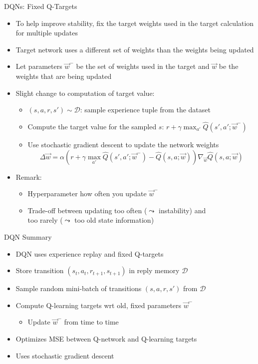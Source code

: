 \begin{frame}[c]{DQNs: Fixed Q-Targets}
	
	\begin{itemize}
		\item To help improve stability, fix the \alert{target weights} used in the target calculation for multiple updates
		\item Target network uses a different set of weights than the weights being updated
		\item Let parameters $\vec{w}^-$ be the set of weights used in the target and $\vec{w}$ be the weights that are being updated
		\item Slight change to computation of target value:
		\begin{itemize}
			\item $(s,a,r,s')\sim \mathcal{D}$: sample experience tuple from the dataset
			\item Compute the target value for the sampled $s$: $r+\gamma \max_{a'} \hat{Q}(s',a';\vec{w}^-)$
			\item Use stochastic gradient descent to update the network weights
			$$\Delta \vec{w} = \alpha (r + \gamma \max_{a'} \hat{Q}(s',a';\vec{w}^-) - \hat{Q}(s,a;\vec{w})) \nabla_{\vec{w}}\hat{Q}(s,a;\vec{w})$$
		\end{itemize}
		\smallskip 
		\pause
		\item Remark:
		\begin{itemize}
			\item Hyperparameter how often you update $\vec{w}^-$
			\item Trade-off between updating too often ($\leadsto$ instability) and\\ too rarely ($\leadsto$ too old state information)
		\end{itemize}
	\end{itemize}
	
\end{frame}
\begin{frame}[c]{DQN Summary}
	
	\begin{itemize}
		\item DQN uses experience replay and fixed Q-targets
		\item Store transition $(s_t, a_t, r_{t+1}, s_{t+1})$ in reply memory $\mathcal{D}$
		\item Sample random mini-batch of transitions $(s,a,r,s')$ from $\mathcal{D}$
		\item Compute Q-learning targets wrt old, fixed parameters $\vec{w}^-$
		\begin{itemize}
			\item Update $\vec{w}^-$ from time to time
		\end{itemize}
		\item Optimizes MSE between Q-network and Q-learning targets
		\item Uses stochastic gradient descent
	\end{itemize}
	
\end{frame}

